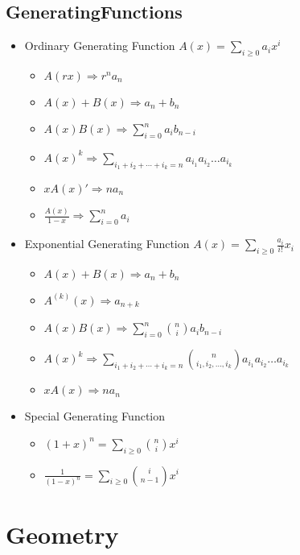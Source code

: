 \documentclass[10pt, a4paper, twocolumn, oneside]{article}
\begin{document}
\subsection{GeneratingFunctions}
\begin{itemize}
\item Ordinary Generating Function
$A(x) = \sum_{i\ge 0} a_ix^i$
\begin{itemize}
    \itemsep-0.5em
    \item $A(rx)             \Rightarrow r^na_n$
    \item $A(x) + B(x)       \Rightarrow a_n + b_n$
    \item $A(x)B(x)          \Rightarrow \sum_{i=0}^{n} a_ib_{n-i}$
    \item $A(x)^k            \Rightarrow \sum_{i_1+i_2+\cdots+i_k=n} a_{i_1}a_{i_2}\ldots a_{i_k}$
    \item $xA(x)'            \Rightarrow na_n$
    \item $\frac{A(x)}{1-x}  \Rightarrow \sum_{i=0}^{n} a_i$
\end{itemize}
\item Exponential Generating Function
$A(x) = \sum_{i\ge 0} \frac{a_i}{i!}x_i$
\begin{itemize}
    \itemsep-0.5em
    \item $A(x) + B(x)       \Rightarrow a_n + b_n$
    \item $A^{(k)}(x)        \Rightarrow a_{n+k}$
    \item $A(x)B(x)          \Rightarrow \sum_{i=0}^{n} \binom{n}{i}a_ib_{n-i}$
    \item $A(x)^k            \Rightarrow \sum_{i_1+i_2+\cdots+i_k=n} \binom{n}{i_1, i_2, \ldots, i_k}a_{i_1}a_{i_2}\ldots a_{i_k}$
    \item $xA(x)             \Rightarrow na_n$
\end{itemize}
\item Special Generating Function
\begin{itemize}
    \itemsep-0.5em
    \item $(1+x)^n           = \sum_{i\ge 0} \binom{n}{i}x^i$
    \item $\frac{1}{(1-x)^n} = \sum_{i\ge 0} \binom{i}{n-1}x^i$
\end{itemize}
\end{itemize}
\section{Geometry}
\end{document}

